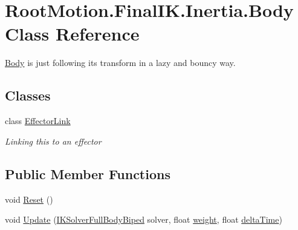\hypertarget{class_root_motion_1_1_final_i_k_1_1_inertia_1_1_body}{}\section{Root\+Motion.\+Final\+I\+K.\+Inertia.\+Body Class Reference}
\label{class_root_motion_1_1_final_i_k_1_1_inertia_1_1_body}


\mbox{\hyperlink{class_root_motion_1_1_final_i_k_1_1_inertia_1_1_body}{Body}} is just following it\textquotesingle{}s transform in a lazy and bouncy way.  


\subsection*{Classes}
\begin{DoxyCompactItemize}
\item 
class \mbox{\hyperlink{class_root_motion_1_1_final_i_k_1_1_inertia_1_1_body_1_1_effector_link}{Effector\+Link}}
\begin{DoxyCompactList}\small\item\em Linking this to an effector \end{DoxyCompactList}\end{DoxyCompactItemize}
\subsection*{Public Member Functions}
\begin{DoxyCompactItemize}
\item 
void \mbox{\hyperlink{class_root_motion_1_1_final_i_k_1_1_inertia_1_1_body_a801423a6f567439c5d3d8e133f6c7bb6}{Reset}} ()
\item 
void \mbox{\hyperlink{class_root_motion_1_1_final_i_k_1_1_inertia_1_1_body_ade2cd8542554e3f678dda6a746742c26}{Update}} (\mbox{\hyperlink{class_root_motion_1_1_final_i_k_1_1_i_k_solver_full_body_biped}{I\+K\+Solver\+Full\+Body\+Biped}} solver, float \mbox{\hyperlink{class_root_motion_1_1_final_i_k_1_1_offset_modifier_a3a2cd2134e8a197e6a77b48fcf9aa5d4}{weight}}, float \mbox{\hyperlink{class_root_motion_1_1_final_i_k_1_1_offset_modifier_ac5aeb27ca30313e6791867cbd4109940}{delta\+Time}})
\end{DoxyCompactItemize}
